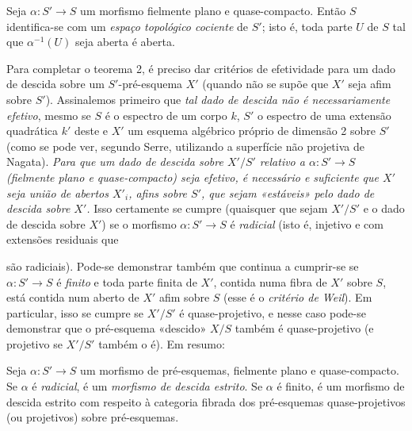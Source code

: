  Seja $\alpha:S'\longrightarrow S$ um morfismo fielmente plano
e quase-compacto. Então $S$ identifica-se com um \emph{espaço topológico
cociente} de $S'$; isto é, toda parte $U$ de $S$ tal que
$\alpha^{-1}(U)$ seja aberta é aberta.

Para completar o teorema 2, é preciso dar critérios de efetividade para um dado
de descida sobre um $S'$-pré-esquema $X'$ (quando não se supõe que $X'$ seja
afim sobre $S'$). Assinalemos primeiro que \emph{tal dado de descida não é
necessariamente efetivo}, mesmo se $S$ é o espectro de um corpo $k$, $S'$
o espectro de uma extensão quadrática $k'$ deste e $X'$ um esquema
algébrico próprio de dimensão 2 sobre $S'$ (como se pode ver, segundo Serre,
utilizando a superfície não projetiva de Nagata). \emph{Para que um dado de
descida sobre $X'/S'$ relativo a $\alpha:S'\longrightarrow S$ (fielmente
plano e quase-compacto) seja efetivo, é necessário e suficiente que $X'$ seja
união de abertos $X'_i$, afins sobre $S'$, que sejam «estáveis» pelo dado de
descida sobre $X'$.} Isso certamente se cumpre (quaisquer que sejam $X'/S'$
e o dado de descida sobre $X'$) se o morfismo
$\alpha:S'\longrightarrow S$ é \emph{radicial} (isto é, injetivo e com
extensões residuais que

são radiciais). Pode-se demonstrar também que continua a cumprir-se se
$\alpha:S'\longrightarrow S$ é \emph{finito} e toda parte finita de $X'$,
contida numa fibra de $X'$ sobre $S$, está contida num aberto de $X'$
afim sobre $S$ (esse é o \emph{critério de Weil}). Em particular, isso se
cumpre se $X'/S'$ é quase-projetivo, e nesse caso pode-se demonstrar que o
pré-esquema «descido» $X/S$ também é quase-projetivo (e projetivo se
$X'/S'$ também o é). Em resumo:

 Seja $\alpha:S'\longrightarrow S$ um morfismo de
pré-esquemas, fielmente plano e quase-compacto. Se $\alpha$ é \emph{radicial},
é um \emph{morfismo de descida estrito}. Se $\alpha$ é finito, é um
morfismo de descida estrito com respeito à categoria fibrada dos
pré-esquemas quase-projetivos (ou projetivos) sobre pré-esquemas.

